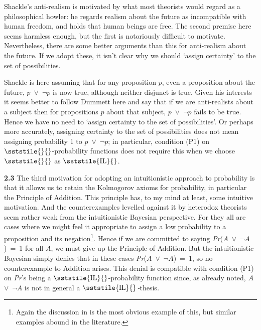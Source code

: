 \noindent Shackle's anti-realism is motivated by what most theorists would regard as a philosophical howler: he regards realism about the future as incompatible with human freedom, and holds that human beings are free. The second premise here seems harmless enough, but the first is notoriously difficult to motivate. Nevertheless, there are some better arguments than this for anti-realism about the future. If we adopt these, it isn't clear why we should `assign certainty' to the set of possibilities.

Shackle is here assuming that for any proposition \(p\), even a proposition about the future, \(p\)~${\vee}$~${\lnot}$\(p\) is now true, although neither disjunct is true. Given his interests it seems better to follow Dummett here and say that if we are anti-realists about a subject then for propositions \(p\) about that subject, \(p\)~${\vee}$~${\lnot}$\(p\) fails to be true. Hence we have no need to `assign certainty to the set of possibilities'. Or perhaps more accurately, assigning certainty to the set of possibilities does not mean assigning probability 1 to \(p\)~${\vee}$~${\lnot}$\(p\); in particular, condition (P1) on {\small \(\sststile{}{}\)}{}-probability functions does not require this when we choose {\small \(\sststile{}{}\)} as {\small \(\sststile{\mathrm{IL}}{}\)}.

\textbf{2.3} The third motivation for adopting an intuitionistic approach to probability is that it allows us to retain the Kolmogorov axioms for probability, in particular the Principle of Addition. This principle has, to my mind at least, some intuitive motivation. And the counterexamples levelled against it by heterodox theorists seem rather weak from the intuitionistic Bayesian perspective. For they all are cases where we might feel it appropriate to assign a low probability to a proposition and its negation\footnote{Again the discussion in \cite[ch. 2]{Shafer1976} is the most obvious example of this, but similar examples abound in the literature.}. Hence if we are committed to saying \textit{Pr}(\(A\)~${\vee}$~${\lnot}$\(A\))~=~1 for all \(A\), we must give up the Principle of Addition. But the intuitionistic Bayesian simply denies that in these cases \textit{Pr}(\(A\)~${\vee}$~${\lnot}$\(A\))~=~1, so no counterexample to Addition arises. This denial is compatible with condition (P1) on \textit{Pr}'s being a {\small \(\sststile{\mathrm{IL}}{}\)}{}-probability function since, as already noted, \(A\)~${\vee}$~${\lnot}$\(A\) is not in general a {\small \(\sststile{\mathrm{IL}}{}\)}\textit{{}-}thesis\textit{.}

